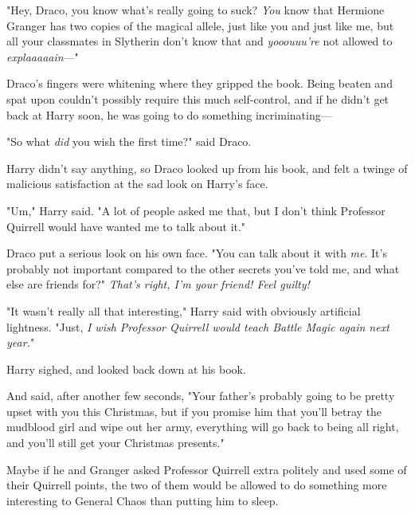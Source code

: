 "Hey, Draco, you know what's really going to suck? \emph{You} know that 
Hermione Granger has two copies of the magical allele, just like you and just 
like me, but all your classmates in Slytherin don't know that and 
\emph{yooouuu're} not allowed to \emph{explaaaaain}---"

Draco's fingers were whitening where they gripped the book. Being beaten and 
spat upon couldn't possibly require this much self-control, and if he didn't 
get back at Harry soon, he was going to do something incriminating---

"So what \emph{did} you wish the first time?" said Draco.

Harry didn't say anything, so Draco looked up from his book, and felt a twinge 
of malicious satisfaction at the sad look on Harry's face.

"Um," Harry said. "A lot of people asked me that, but I don't think Professor 
Quirrell would have wanted me to talk about it."

Draco put a serious look on his own face. "You can talk about it with 
\emph{me}. It's probably not important compared to the other secrets you've 
told me, and what else are friends for?" \emph{That's right, I'm your friend! 
Feel guilty!}

"It wasn't really all that interesting," Harry said with obviously artificial 
lightness. "Just, \emph{I wish Professor Quirrell would teach Battle Magic 
again next year.}"

Harry sighed, and looked back down at his book.

And said, after another few seconds, "Your father's probably going to be pretty 
upset with you this Christmas, but if you promise him that you'll betray the 
mudblood girl and wipe out her army, everything will go back to being all 
right, and you'll still get your Christmas presents."

Maybe if he and Granger asked Professor Quirrell extra politely and used some 
of their Quirrell points, the two of them would be allowed to do something more 
interesting to General Chaos than putting him to sleep.